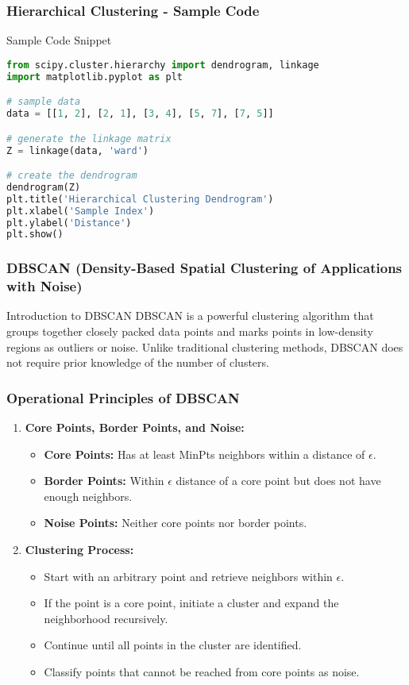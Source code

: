 \documentclass[aspectratio=169]{beamer}
\begin{document}
\begin{frame}[fragile]
    \frametitle{Hierarchical Clustering - Sample Code}
    \begin{block}{Sample Code Snippet}
        \begin{lstlisting}[language=Python]
from scipy.cluster.hierarchy import dendrogram, linkage
import matplotlib.pyplot as plt

# sample data
data = [[1, 2], [2, 1], [3, 4], [5, 7], [7, 5]]

# generate the linkage matrix
Z = linkage(data, 'ward')

# create the dendrogram
dendrogram(Z)
plt.title('Hierarchical Clustering Dendrogram')
plt.xlabel('Sample Index')
plt.ylabel('Distance')
plt.show()
        \end{lstlisting}
    \end{block}
\end{frame}

\begin{frame}[fragile]
    \frametitle{DBSCAN (Density-Based Spatial Clustering of Applications with Noise)}
    \begin{block}{Introduction to DBSCAN}
        DBSCAN is a powerful clustering algorithm that groups together closely packed data points and marks points in low-density regions as outliers or noise. 
        Unlike traditional clustering methods, DBSCAN does not require prior knowledge of the number of clusters.
    \end{block}
\end{frame}

\begin{frame}[fragile]
    \frametitle{Operational Principles of DBSCAN}
    \begin{enumerate}
        \item \textbf{Core Points, Border Points, and Noise:}
        \begin{itemize}
            \item \textbf{Core Points:} Has at least MinPts neighbors within a distance of $\epsilon$.
            \item \textbf{Border Points:} Within $\epsilon$ distance of a core point but does not have enough neighbors.
            \item \textbf{Noise Points:} Neither core points nor border points.
        \end{itemize}
        
        \item \textbf{Clustering Process:}
        \begin{itemize}
            \item Start with an arbitrary point and retrieve neighbors within $\epsilon$.
            \item If the point is a core point, initiate a cluster and expand the neighborhood recursively.
            \item Continue until all points in the cluster are identified.
            \item Classify points that cannot be reached from core points as noise.
        \end{itemize}
    \end{enumerate}
\end{frame}
\end{document}
